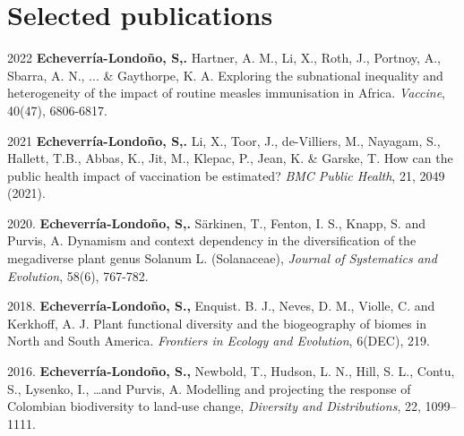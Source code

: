 \documentclass[ a4paper]{twentysecondcv} %
\begin{document}
\section{Selected publications}

2022 \textbf{Echeverr\'ia-Londo\~no, S,.}  Hartner, A. M., Li, X., Roth, J., Portnoy, A., Sbarra, A. N., ... \& Gaythorpe, K. A. Exploring the subnational inequality and heterogeneity of the impact of routine measles immunisation in Africa. \textit{Vaccine}, 40(47), 6806-6817. 

2021 \textbf{Echeverr\'ia-Londo\~no, S,.}  Li, X., Toor, J., de-Villiers, M., Nayagam, S., Hallett, T.B., Abbas, K., Jit, M., Klepac, P., Jean, K. \&  Garske, T. How can the public health impact of vaccination be estimated? \textit{BMC Public Health}, 21, 2049 (2021).

2020. \textbf{Echeverr\'ia-Londo\~no, S,.}  S{\"a}rkinen, T., Fenton, I. S., Knapp, S. and Purvis, A. Dynamism and context dependency in the diversification of the megadiverse plant genus Solanum L. (Solanaceae), \textit{Journal of Systematics and Evolution},  58(6), 767-782. 

2018. \textbf{Echeverr\'ia-Londo\~no, S.,} Enquist. B. J., Neves, D. M., Violle, C. and Kerkhoff, A. J. Plant functional diversity and the biogeography of biomes in North and South America. \textit{Frontiers in Ecology and Evolution}, 6(DEC), 219.

2016. \textbf{Echeverr\'ia-Londo\~no, S.,} Newbold, T., Hudson, L. N., Hill, S. L., Contu, S., Lysenko, I., \dots and Purvis, A. Modelling and projecting the response of Colombian biodiversity to land-use change, \textit{Diversity and Distributions}, 22, 1099--1111. 
\end{document}
